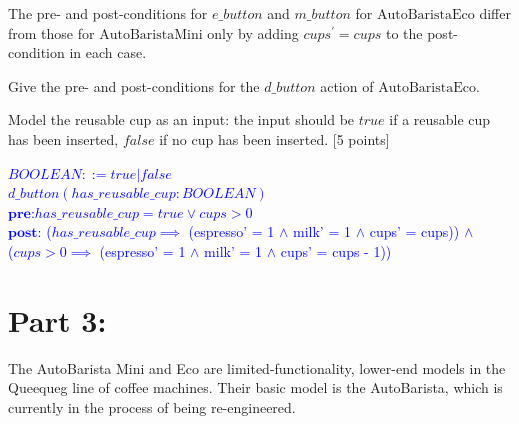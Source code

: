 \documentclass[12pt,fleqn]{article}
\begin{document}
\begin{enumerate}
The pre- and post-conditions for $e\_button$ and $m\_button$ for $\mathrm{AutoBaristaEco}$ differ from those for $\mathrm{AutoBaristaMini}$ only by adding $cups^\prime = cups$ to the post-condition in each case.

Give the pre- and post-conditions for the $d\_button$ action of $\mathrm{AutoBaristaEco}$.

Model the reusable cup as an input: the input should be $true$ if a reusable cup has been inserted, $false$ if no cup has been inserted. [5 points]


\textcolor{blue}{
  $BOOLEAN ::= true \vert false$ \\
  $d\_button(has\_reusable\_cup: BOOLEAN)$ \\
  $\textbf{pre:} has\_reusable\_cup = true \lor cups > 0$  \\
  $\textbf{post:}$ ($has\_reusable\_cup \implies$ (espresso' = 1 $\land$ milk' = 1 $\land$ cups' = cups)) $\land$ \\
                   ($cups > 0 \implies$ (espresso' = 1 $\land$ milk' = 1 $\land$ cups' = cups - 1)) \\
}


\clearpage

\section*{\sc Part 3:}

The AutoBarista Mini and Eco are limited-functionality, lower-end models in the Queequeg line of coffee machines. Their basic model is the AutoBarista, which is currently in the process of being re-engineered.


\end{enumerate}
\end{document}
